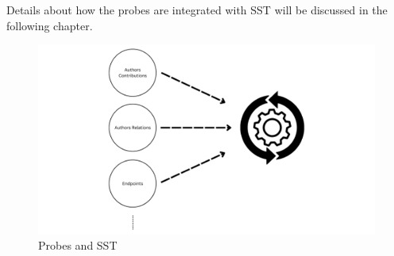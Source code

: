 Details about how the probes are integrated with SST will be discussed in the following chapter.

\begin{figure}[H]
    \centering
    \includegraphics[width=1\textwidth]{figures/sst_working.png}
    \caption[Probes and SST]{Probes and SST}
    \label{fig_probes_sst}
\end{figure}